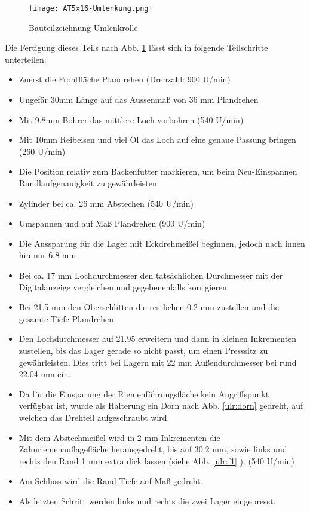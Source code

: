 \begin{figure}[H]
    \centering
    \texttt{[image: AT5x16-Umlenkung.png]}
    \caption{Bauteilzeichnung Umlenkrolle}
    \label{UmlenkrolleBTZ}
\end{figure}

Die Fertigung dieses Teils nach Abb. \ref{UmlenkrolleBTZ} lässt sich in folgende Teilschritte unterteilen:
\begin{itemize}
    \setlength\itemsep{-1mm} 
    \item Zuerst die Frontfläche Plandrehen (Drehzahl: 900 U/min)
    \item Ungefär 30mm Länge auf das Aussenmaß von 36 mm Plandrehen
    \item Mit 9.8mm Bohrer das mittlere Loch vorbohren (540 U/min)
    \item Mit 10mm Reibeisen und viel Öl das Loch auf eine genaue Passung bringen (260 U/min)
    \item Die Position relativ zum Backenfutter markieren, um beim Neu-Einspannen Rundlaufgenauigkeit zu gewährleisten
    \item Zylinder bei ca. 26 mm Abstechen (540 U/min)
    \item Umspannen und auf Maß Plandrehen (900 U/min)
    \item Die Aussparung für die Lager mit Eckdrehmeißel beginnen, jedoch nach innen hin nur 6.8 mm
    \item Bei ca. 17 mm Lochdurchmesser den tatsächlichen Durchmesser mit der Digitalanzeige vergleichen und gegebenenfalls korrigieren
    \item Bei 21.5 mm den Oberschlitten die restlichen 0.2 mm zustellen und die gesamte Tiefe Plandrehen
    \item Den Lochdurchmesser auf 21.95 erweitern und dann in kleinen Inkrementen zustellen, bis das Lager gerade so nicht passt, um einen Presssitz zu gewährleisten. Dies tritt bei Lagern mit 22 mm Außendurchmesser bei rund 22.04 mm ein.
    \item Da für die Einsparung der Riemenführungsfläche kein Angriffspunkt verfügbar ist, wurde als Halterung ein Dorn nach Abb. \ref{ulr:dorn} gedreht, auf welchen das Drehteil aufgeschraubt wird.
    \item Mit dem Abstechmeißel wird in 2 mm Inkrementen die Zahnriemenauflagefläche herausgedreht, bis auf 30.2 mm, sowie links und rechts den Rand 1 mm extra dick lassen (siehe Abb. \ref{ulr:f1} ). (540 U/min)
    \item Am Schluss wird die Rand Tiefe auf Maß gedreht.
    \item Als letzten Schritt werden links und rechts die zwei Lager eingepresst.
\end{itemize}

